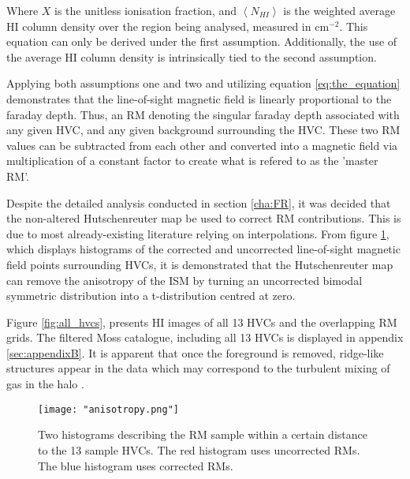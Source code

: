 Where $X$ is the unitless ionisation fraction, and $\left<N_{HI}\right>$ is the weighted average HI column density over the region being analysed, measured in $\mathrm{cm}^{-2}$. This equation can only be derived under the first assumption. Additionally, the use of the average HI column density is intrinsically tied to the second assumption.


Applying both assumptions one and two and utilizing equation \ref{eq:the_equation} demonstrates that the line-of-sight magnetic field is linearly proportional to the faraday depth. Thus, an RM denoting the singular faraday depth associated with any given HVC, and any given background surrounding the HVC. These two RM values can be subtracted from each other and converted into a magnetic field via multiplication of a constant factor to create what is refered to as the 'master RM'.


Despite the detailed analysis conducted in section \ref{cha:FR}, it was decided that the non-altered Hutschenreuter map be used to correct RM contributions. This is due to most already-existing literature relying on interpolations. From figure \ref{fig:anisotropy}, which displays histograms of the corrected and uncorrected line-of-sight magnetic field points surrounding HVCs, it is demonstrated that the Hutschenreuter map can remove the anisotropy of the ISM by turning an uncorrected bimodal symmetric distribution into a t-distribution centred at zero.


Figure \ref{fig:all_hvcs}, presents HI images of all 13 HVCs and the overlapping RM grids. The filtered Moss catalogue, including all 13 HVCs is displayed in appendix \ref{sec:appendixB}. It is apparent that once the foreground is removed, ridge-like structures appear in the data which may correspond to the turbulent mixing of gas in the halo \citep{ID69, ID30}.

\begin{figure}
    \texttt{[image: "anisotropy.png"]}
    \centering
    \caption{Two histograms describing the RM sample within a certain distance to the 13 sample HVCs. The red histogram uses uncorrected RMs. The blue histogram uses corrected RMs.}
    \label{fig:anisotropy}
\end{figure}

%

